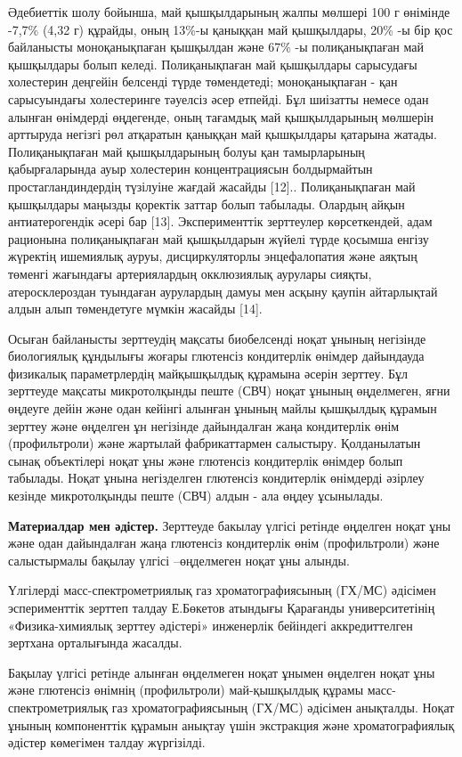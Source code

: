 \begin{multicols}{2}
Әдебиеттік шолу бойынша, май қышқылдарының жалпы мөлшері 100 г өнімінде
-7,7\% (4,32 г) құрайды, оның 13\%-ы қаныққан май қышқылдары, 20\% -ы
бір қос байланысты моноқанықпаған қышқылдан және 67\% -ы полиқанықпаған
май қышқылдары болып келеді. Полиқанықпаған май қышқылдары сарысудағы
холестерин деңгейін белсенді түрде төмендетеді; моноқанықпаған - қан
сарысуындағы холестеринге тәуелсіз әсер етпейді. Бұл шиізатты немесе
одан алынған өнімдерді өңдегенде, оның тағамдық май қышқылдарының
мөлшерін арттыруда негізгі рөл атқаратын қаныққан май қышқылдары
қатарына жатады. Полиқанықпаған май қышқылдарының болуы қан тамырларының
қабырғаларында ауыр холестерин концентрациясын болдырмайтын
простагландиндердің түзілуіне жағдай жасайды {[}12{]}.. Полиқанықпаған
май қышқылдары маңызды қоректік заттар болып табылады. Олардың айқын
антиатерогендік әсері бар {[}13{]}. Эксперименттік зерттеулер
көрсеткендей, адам рационына полиқанықпаған май қышқылдарын жүйелі түрде
қосымша енгізу жүректің ишемиялық ауруы, дисциркуляторлы энцефалопатия
және аяқтың төменгі жағындағы артериялардың окклюзиялық аурулары сияқты,
атеросклероздан туындаған аурулардың дамуы мен асқыну қаупін айтарлықтай
алдын алып төмендетуге мүмкін жасайды {[}14{]}.

Осыған байланысты зерттеудің мақсаты биобелсенді ноқат ұнының негізінде
биологиялық құндылығы жоғары глютенсіз кондитерлік өнімдер дайындауда
физикалық параметрлердің майқышқылдық құрамына әсерін зерттеу. Бұл
зерттеуде мақсаты микротолқынды пеште (СВЧ) ноқат ұнының өңделмеген,
яғни өңдеуге дейін және одан кейінгі алынған ұнының майлы қышқылдық
құрамын зерттеу және өңделген ұн негізінде дайындалған жаңа кондитерлік
өнім (профильтроли) және жартылай фабрикаттармен салыстыру. Қолданылатын
сынақ объектілері ноқат ұны және глютенсіз кондитерлік өнімдер болып
табылады. Ноқат ұнына негізделген глютенсіз кондитерлік өнімдерді
әзірлеу кезінде микротолқынды пеште (СВЧ) алдын - ала өңдеу ұсынылады.

{\bfseries Материалдар мен әдістер.} Зерттеуде бакылау үлгісі ретінде өңделген ноқат ұны және одан
дайындалған жаңа глютенсіз кондитерлік өнім (профильтроли) және
салыстырмалы бақылау үлгісі --өңделмеген ноқат ұны алынды.

Үлгілерді масс-спектрометриялық газ хроматографиясының (ГХ/МС) әдісімен
эсперименттік зерттеп талдау Е.Бөкетов атындығы Қарағанды
университетінің «Физика-химиялық зерттеу әдістері» инженерлік бейіндегі
аккредиттелген зертхана орталығында жасалды.

Бақылау үлгісі ретінде алынған өңделмеген ноқат ұнымен өңделген ноқат
ұны және глютенсіз өнімнің (профильтроли) май-қышқылдық құрамы
масс-спектрометриялық газ хроматографиясының (ГХ/МС) әдісімен анықталды.
Ноқат ұнының компоненттік құрамын анықтау үшін экстракция және
хроматографиялық әдістер көмегімен талдау жүргізілді.


\end{multicols}

